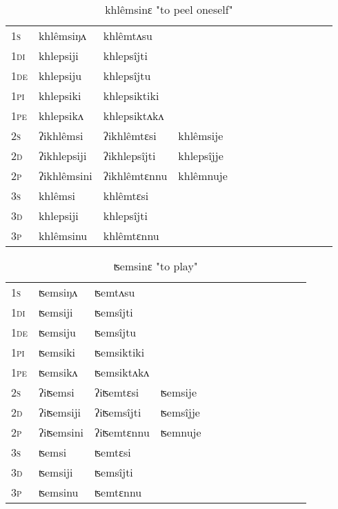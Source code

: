 \documentclass[oldfontcommands,oneside,a4paper,11pt]{article}
\begin{document}
\begin{table}[H]
\label{ep.vr} \centering 
\caption{khlêmsinɛ  "to peel oneself"  }
\begin{tabular}{l|l|l|l|l|l|l|l|l|l|l|l|l}  \toprule
\textsc{1s} &khlêmsiŋʌ &khlêmtʌsu \\ 
\textsc{1di} &khlepsiji &khlepsîjti   \\
\textsc{1de} &khlepsiju &khlepsîjtu   \\ 
\textsc{1pi} &khlepsiki &khlepsiktiki   \\ 
\textsc{1pe} &khlepsikʌ &khlepsiktʌkʌ   \\ 
\textsc{2s} & ʔikhlêmsi & ʔikhlêmtɛsi &khlêmsije  \\ 
\textsc{2d} & ʔikhlepsiji & ʔikhlepsîjti &khlepsîjje    \\
\textsc{2p} & ʔikhlêmsini  & ʔikhlêmtɛnnu &khlêmnuje  \\ 
\textsc{3s} & khlêmsi & khlêmtɛsi   \\ 
\textsc{3d} & khlepsiji & khlepsîjti   \\ 
\textsc{3p} & khlêmsinu  & khlêmtɛnnu \\ 
\bottomrule
\end{tabular}
\end{table}


\begin{table}[H]
\label{em.vr} \centering 
\caption{ʦemsinɛ  "to play"  }
\begin{tabular}{l|l|l|l|l|l|l|l|l|l|l|l|l}  \toprule
\textsc{1s} &ʦemsiŋʌ &ʦemtʌsu \\ 
\textsc{1di} &ʦemsiji &ʦemsîjti   \\
\textsc{1de} &ʦemsiju &ʦemsîjtu   \\ 
\textsc{1pi} &ʦemsiki &ʦemsiktiki   \\ 
\textsc{1pe} &ʦemsikʌ &ʦemsiktʌkʌ   \\ 
\textsc{2s} & ʔiʦemsi & ʔiʦemtɛsi &ʦemsije  \\ 
\textsc{2d} & ʔiʦemsiji & ʔiʦemsîjti &ʦemsîjje    \\
\textsc{2p} & ʔiʦemsini  & ʔiʦemtɛnnu &ʦemnuje  \\ 
\textsc{3s} & ʦemsi & ʦemtɛsi   \\ 
\textsc{3d} & ʦemsiji & ʦemsîjti   \\ 
\textsc{3p} & ʦemsinu  & ʦemtɛnnu \\ 
\bottomrule
\end{tabular}
\end{table}
\end{document}
